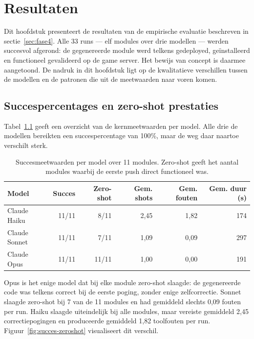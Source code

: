 
\chapter{Resultaten}\label{ch:resultaten}

Dit hoofdstuk presenteert de resultaten van de empirische evaluatie beschreven in sectie~\ref{sec:fase4}. Alle 33 runs — elf modules over drie modellen — werden succesvol afgerond: de gegenereerde module werd telkens gedeployed, geïnstalleerd en functioneel gevalideerd op de game server. Het bewijs van concept is daarmee aangetoond. De nadruk in dit hoofdstuk ligt op de kwalitatieve verschillen tussen de modellen en de patronen die uit de meetwaarden naar voren komen.

\section{Succespercentages en zero-shot prestaties}\label{sec:resultaten-succes}

Tabel~\ref{tab:succes-model} geeft een overzicht van de kernmeetwaarden per model. Alle drie de modellen bereikten een succespercentage van 100\%, maar de weg daar naartoe verschilt sterk.

\begin{table}[h]
\centering
\begin{tabular}{lrrrrr}
\toprule
\textbf{Model} & \textbf{Succes} & \textbf{Zero-shot} & \textbf{Gem. shots} & \textbf{Gem. fouten} & \textbf{Gem. duur (s)} \\
\midrule
Claude Haiku  & 11/11 & 8/11  & 2,45 & 1,82 & 174 \\
Claude Sonnet & 11/11 & 7/11  & 1,09 & 0,09 & 297 \\
Claude Opus   & 11/11 & 11/11 & 1,00 & 0,00 & 191 \\
\bottomrule
\end{tabular}
\caption[Succesmeetwaarden per model]{Succesmeetwaarden per model over 11 modules. Zero-shot geeft het aantal modules waarbij de eerste push direct functioneel was.}\label{tab:succes-model}
\end{table}

Opus is het enige model dat bij elke module zero-shot slaagde: de gegenereerde code was telkens correct bij de eerste poging, zonder enige zelfcorrectie. Sonnet slaagde zero-shot bij 7 van de 11 modules en had gemiddeld slechts 0,09 fouten per run. Haiku slaagde uiteindelijk bij alle modules, maar vereiste gemiddeld 2,45 correctiepogingen en produceerde gemiddeld 1,82 toolfouten per run. Figuur~\ref{fig:succes-zeroshot} visualiseert dit verschil.

